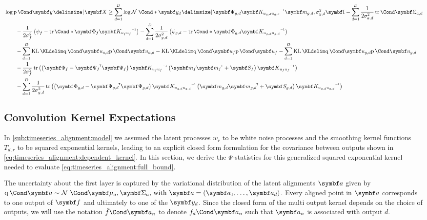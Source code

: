 \begin{align}
    \label{eq:timeseries_alignment:full_bound}
    \begin{split}
        \MoveEqLeft\log \Prob{\rv{y}\given \mat{X}} \geq
        \sum_{d=1}^D \log\Gaussian*{\rv{y_d} \given \mat{\Psi_{g, d}} \mat{K_{u_{g, d}u_{g, d}}}\inv \mat{m_{g, d}}, \sigma_{y, d}^2 \Eye}
        - \sum_{d=1}^D \frac{1}{2\sigma_{a, d}^2} \Fun{\tr}{\mat{\Sigma_{a, d}}} \\
        &- \frac{1}{2\sigma_f^2} \left( \psi_{f} - \Fun*{\tr}{\mat{\Phi_f} \mat{K_{u_fu_f}}\inv} \right)
        - \sum_{d=1}^D\frac{1}{2\sigma_{y, d}^2} \left( \psi_{g, d} - \Fun*\tr{\mat{\Phi_{g, d}} \mat{K_{u_{g, d}u_{g, d}}}\inv} \right) \\
        &- \sum_{d=1}^D \KL{\Variat{\rv{u_{a, d}}}}{\Prob{\rv{u_{a, d}}}}
        - \KL{\Variat{\rv{u_f}}}{\Prob{\rv{u_f}}}
        - \sum_{d=1}^D \KL{\Variat{\rv{u_{y, d}}}}{\Prob{\rv{u_{y, d}}}} \\
        &- \frac{1}{2\sigma_f^2} \tr\left(\left(\mat{\Phi_f} - \mat{\Psi_f}\tran\mat{\Psi_f}\right) \mat{K_{u_fu_f}}\inv \left(\mat{m_f}\mat{m_f}\tran + \mat{S_f}\right)\mat{K_{u_fu_f}}\inv\right) \\
        &- \sum_{d=1}^D\frac{1}{2\sigma_{y, d}^2} \tr\left(\left(\mat{\Phi_{g, d}} - \mat{\Psi_{g, d}}\tran\mat{\Psi_{g, d}}\right)
        \mat{K_{u_{g, d}u_{g, d}}}\inv \left(\mat{m_{g, d}}\mat{m_{g, d}}\tran + \mat{S_{g, d}}\right) \mat{K_{u_{g, d}u_{g, d}}}\inv\right)
    \end{split}
\end{align}

\subsection{Convolution Kernel Expectations}
\label{sub:timeseries_alignment:kernel_expectations}
In \cref{sub:timeseries_alignment:model} we assumed the latent processes $w_r$ to be white noise processes and the smoothing kernel functions $T_{d, r}$ to be squared exponential kernels, leading to an explicit closed form formulation for the covariance between outputs shown in \cref{eq:timeseries_alignment:dependent_kernel}.
In this section, we derive the $\Psi$-statistics for this generalized squared exponential kernel needed to evaluate \cref{eq:timeseries_alignment:full_bound}.

The uncertainty about the first layer is captured by the variational distribution of the latent alignments $\rv{a}$ given by $\Variat{\rv{a}} \sim \Gaussian{\mat{\mu_a}, \mat{\Sigma_a}}\text{, with } \rv{a} = \left( \rv{a_1}, \dots, \rv{a_d} \right)$.
Every aligned point in $\rv{a}$ corresponds to one output of $\rv{f}$ and ultimately to one of the $\rv{y_d}$.
Since the closed form of the multi output kernel depends on the choice of outputs, we will use the notation $\Fun{\hat{f}}{\rv{a_n}}$ to denote $\Fun{f_d}{\rv{a_n}}$ such that $\rv{a_n}$ is associated with output $d$.

